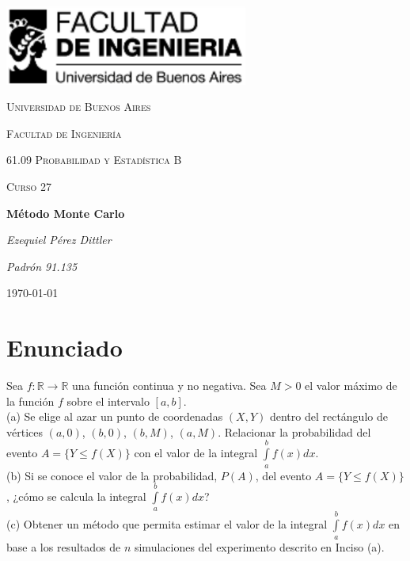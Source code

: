 \documentclass[a4paper]{article}
\begin{document}
\begin{titlepage}
  \centering
  \includegraphics[width=0.6\textwidth]{logo_fiuba.pdf}\par\vspace{1cm}
  {\scshape\LARGE Universidad de Buenos Aires \par}
  {\scshape\LARGE Facultad de Ingeniería \par}
  \vspace{1cm}
  {\scshape\Large 61.09 Probabilidad y Estadística B\par}
  {\scshape\Large Curso 27\par}
  \vspace{1.5cm}
  {\huge\bfseries Método Monte Carlo\par}
  \vspace{2cm}
  {\Large\itshape Ezequiel Pérez Dittler \par}
  {\Large\itshape Padrón 91.135 \par}

  \vfill

  {\large \today\par}
\end{titlepage}

\newpage

\section*{Enunciado}
Sea $f: \mathbb{R} \to \mathbb{R}$ una función continua y no negativa.
Sea $M > 0$ el valor máximo de la función $f$ sobre el intervalo $[a, b]$. \\

(a) Se elige al azar un punto de coordenadas $(X, Y)$ dentro del rectángulo de
vértices $(a, 0)$, $(b, 0)$, $(b, M)$, $(a, M)$. Relacionar la probabilidad
del evento $A = \{ Y \leqslant f(X) \}$ con el valor de la integral
$\int\limits_a^b f(x) dx$. \\

(b) Si se conoce el valor de la probabilidad, $P(A)$, del evento
$A = \{ Y \leqslant f(X) \}$, ¿cómo se calcula la integral
$\int\limits_a^b f(x) dx$? \\

(c) Obtener un método que permita estimar el valor de la integral
$\int\limits_a^b f(x) dx$ en base a los resultados de $n$ simulaciones del
experimento descrito en Inciso (a). \\
\end{document}
